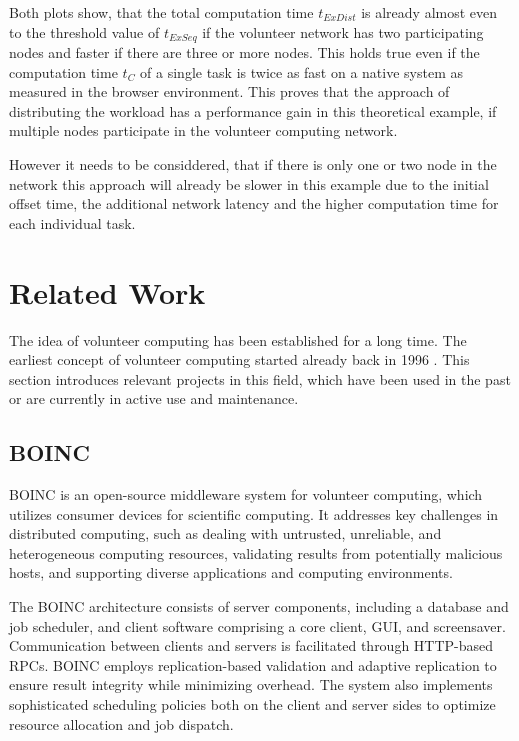 Both plots show, that the total computation time $t_{ExDist}$ is already almost even to the threshold value of $t_{ExSeq}$ if the volunteer network has two participating nodes and faster if there are three or more nodes. This holds true even if the computation time $t_{C}$ of a single task is twice as fast on a native system as measured in the browser environment. This proves that the approach of distributing the workload has a performance gain in this theoretical example, if multiple nodes participate in the volunteer computing network. 

However it needs to be considdered, that if there is only one or two node in the network this approach will already be slower in this example due to the initial offset time, the additional network latency and the higher computation time for each individual task.

\section{Related Work}
\label{sec:background:related_work}
The idea of volunteer computing has been established for a long time. The earliest concept of volunteer computing started already back in 1996 \cite{relatedwork:boinc1}. This section introduces relevant projects in this field, which have been used in the past or are currently in active use and maintenance.

\subsection{BOINC}
\label{subsec:background:related_work:boinc}
\ac{BOINC} is an open-source middleware system for volunteer computing, which utilizes consumer devices for scientific computing. It addresses key challenges in distributed computing, such as dealing with untrusted, unreliable, and heterogeneous computing resources, validating results from potentially malicious hosts, and supporting diverse applications and computing environments. \cite{relatedwork:boinc1}

The BOINC architecture consists of server components, including a database and job scheduler, and client software comprising a core client, GUI, and screensaver. Communication between clients and servers is facilitated through HTTP-based RPCs. BOINC employs replication-based validation and adaptive replication to ensure result integrity while minimizing overhead. The system also implements sophisticated scheduling policies both on the client and server sides to optimize resource allocation and job dispatch. \cite{relatedwork:boinc1}


